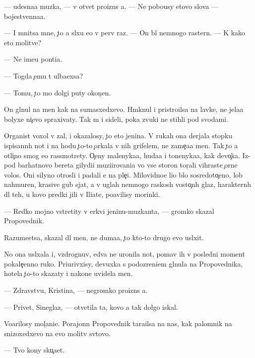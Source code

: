 \documentclass[10pt]{book}
\begin{document}
— {\C}udesna{\y}a muz{\yi}ka, — v otvet proizn{\e}s {\y}a. — Ne pobo{\y}usy etovo slova — bojestvenna{\y}a.

— I mnitsa mne, {\c}to {\y}a sl{\yi}xu {\y}e{\y}o v perv{\yi}{\y} raz. — On b{\yi}l nemnogo raster{\ia}n. — K kako{\y} eto molitve?

— Ne ime{\y}u pon{\ia}ti{\y}a.

— Togda {\c}emu t{\yi} ul{\yi}ba{\y}exsa?

— Tomu, {\c}to mo{\y} dolgi{\y} puty okon{\c}en.

On gl{\ia}nul na men{\ia} kak na sumasxedxevo. Hm{\yi}knul i pristro{\y}ilsa na lavke, ne jela{\y}a bolyxe ni{\c}evo spraxivaty. Tak m{\yi} i sideli, poka zvuki ne stihli pod svodami.

Organist  voxol v zal, i okazalosy, {\c}to eto jen{\x}ina. V rukah ona derjala stopku ispisann{\yi}h not i na hodu {\c}to-to {\c}orkala v nih grifelem, ne zame{\c}a{\y}a men{\ia}. Tak {\c}to {\y}a otli{\c}no smog {\y}e{\y}o rassmotrety. O{\c}eny malenyka{\y}a, huda{\y}a i tonenyka{\y}a, kak devo{\c}ka. Iz-pod barhatnovo bereta gilydi{\y}i muzi{\q}irovani{\y}a vo vse storon{\yi} tor{\c}ali vihrast{\yi}{\y}e {\c}orn{\yi}{\y}e volos{\yi}. Oni silyno otrosli i padali {\y}e{\y} na ple{\c}i. Milovidno{\y}e li{\q}o b{\yi}lo sosredoto{\c}eno, lob nahmuren, krasiv{\yi}{\y}e gub{\yi} sjat{\yi}, a v uglah nemnogo raskos{\yi}h vosto{\c}n{\yi}h glaz, haraktern{\yi}h dl{\ia} teh, u kovo predki jili v Iliate, po{\y}avilisy mor{\x}inki.

— Redko mojno vstretity v {\q}erkvi jen{\x}inu-muz{\yi}kanta, — gromko skazal Propovednik.

Razume{\y}etsa, skazal dl{\ia} men{\ia}, ne duma{\y}a, {\c}to kto-to drugo{\y} {\y}evo usl{\yi}xit.

No ona usl{\yi}xala i, vzdrognuv, {\y}edva ne uronila not{\yi}, po{\y}mav ih v posledni{\y} moment pokale{\c}enno{\y} ruko{\y}. Pri{\x}urivxisy, devuxka s podozreni{\y}em gl{\ia}nula na Propovednika, hotela {\c}to-to skazaty i nakone{\q} uvidela men{\ia}.

— Zdravstvu{\y}, Kristina, — negromko proizn{\e}s {\y}a.

— Privet, Sineglaz{\yi}{\y}, — otvetila ta, kovo {\y}a tak dolgo iskal.

Vo{\q}arilosy mol{\c}ani{\y}e. Porajonn{\yi}{\y} Propovednik tara{\x}ilsa na nas, kak palomnik na snizoxedxevo na {\y}evo molitv{\yi} sv{\ia}tovo.

— Tvo{\y} kony sku{\c}a{\y}et.
\end{document}
